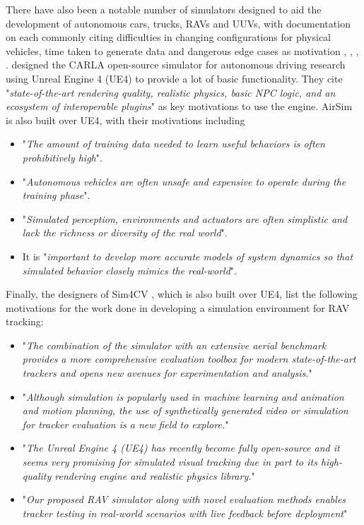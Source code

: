 There have also been a notable number of simulators designed to aid the development of autonomous cars, trucks, RAVs and UUVs, with documentation on each commonly citing difficulties in changing configurations for physical vehicles, time taken to generate data and dangerous edge cases as motivation \cite{Dosovitskiy2017CARLA:Simulator}, \cite{Wymann2015TORCS:Simulator}, \cite{Shah2017AirSim:Vehicles}, \cite{Bojarski2016EndCars}. \citeauthor{Dosovitskiy2017CARLA:Simulator} designed the CARLA open-source simulator \cite{Dosovitskiy2017CARLA:Simulator} for autonomous driving research using Unreal Engine 4 (UE4) to provide a lot of basic functionality. They cite "\textit{state-of-the-art rendering quality, realistic physics, basic NPC logic, and an ecosystem of interoperable plugins}" as key motivations to use the engine. AirSim \cite{Shah2017AirSim:Vehicles} is also built over UE4, with their motivations including
\begin{itemize}
    \item "\textit{The amount of training data needed to learn useful behaviors is often prohibitively high}".
    \item "\textit{Autonomous vehicles are often unsafe and expensive to operate during the training phase}".
    \item "\textit{Simulated perception, environments and actuators are often simplistic and lack the richness or diversity of the real world}".
    \item It is "\textit{important to develop more accurate models of system dynamics so that simulated behavior closely mimics the real-world}".
\end{itemize}

Finally, the designers of Sim4CV \cite{Mueller2016ATracking}, which is also built over UE4, list the following motivations for the work done in developing a simulation environment for RAV tracking:
\begin{itemize}
    \item "\textit{The combination of the simulator with an extensive aerial benchmark provides a more comprehensive evaluation toolbox for modern state-of-the-art trackers and opens new avenues for experimentation and analysis.}"
    \item {} "\textit{Although simulation is popularly used in machine learning and animation and motion planning, the use of synthetically generated video or simulation for tracker evaluation is a new field to explore.}"
    \item "\textit{The Unreal Engine 4 (UE4) has recently become fully open-source and it seems very promising for simulated visual tracking due in part to its high-quality rendering engine and realistic physics library.}"
    \item "\textit{Our proposed RAV simulator along with novel evaluation methods enables tracker testing in real-world scenarios with live feedback before deployment}"
\end{itemize}

